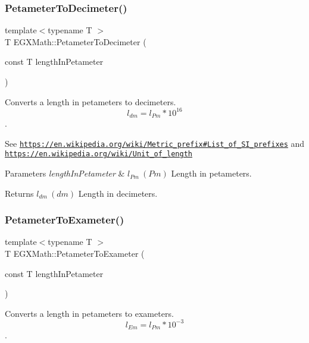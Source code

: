 \subsubsection{\texorpdfstring{Petameter\+To\+Decimeter()}{PetameterToDecimeter()}}
{\footnotesize\ttfamily template$<$typename T $>$ \\
T E\+G\+X\+Math\+::\+Petameter\+To\+Decimeter (\begin{DoxyParamCaption}\item[{const T}]{length\+In\+Petameter }\end{DoxyParamCaption})}



Converts a length in petameters to decimeters. \[ l_{dm}=l_{Pm} * 10^{16} \]. 

See \href{https://en.wikipedia.org/wiki/Metric_prefix#List_of_SI_prefixes}{\tt https\+://en.\+wikipedia.\+org/wiki/\+Metric\+\_\+prefix\#\+List\+\_\+of\+\_\+\+S\+I\+\_\+prefixes} and \href{https://en.wikipedia.org/wiki/Unit_of_length}{\tt https\+://en.\+wikipedia.\+org/wiki/\+Unit\+\_\+of\+\_\+length} 
\begin{DoxyParams}{Parameters}
{\em length\+In\+Petameter} & $ l_{Pm}\ (Pm)$ Length in petameters. \\
\hline
\end{DoxyParams}
\begin{DoxyReturn}{Returns}
$ l_{dm}\ (dm)$ Length in decimeters. 
\end{DoxyReturn}
\mbox{\label{group___e_g_x_math-_conversions-_length_conversions-_s_i-_petameter-_s_i_gade75826e3cd26e484252c5d5a9d1bf8c}} 
\subsubsection{\texorpdfstring{Petameter\+To\+Exameter()}{PetameterToExameter()}}
{\footnotesize\ttfamily template$<$typename T $>$ \\
T E\+G\+X\+Math\+::\+Petameter\+To\+Exameter (\begin{DoxyParamCaption}\item[{const T}]{length\+In\+Petameter }\end{DoxyParamCaption})}



Converts a length in petameters to exameters. \[ l_{Em}=l_{Pm} * 10^{-3} \]. 

